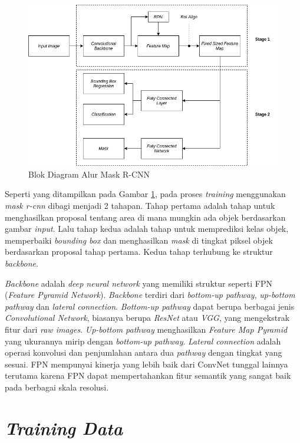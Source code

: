 \begin{figure}[ht]
	\centering
	\includegraphics[scale=0.4]{gambar/mask-rcnn-arch.png}
	\caption{Blok Diagram Alur Mask R-CNN}
	\label{fig:mask-rcnn-arch}
\end{figure} 

Seperti yang ditampilkan pada Gambar \ref{fig:mask-rcnn-arch}, pada proses \textit{training} menggunakan \textit{mask r-cnn} dibagi menjadi 2 tahapan. Tahap pertama adalah tahap untuk menghasilkan proposal tentang area di mana mungkin ada objek berdasarkan gambar \textit{input}. Lalu tahap kedua adalah tahap untuk memprediksi kelas objek, memperbaiki \textit{bounding box} dan menghasilkan \textit{mask} di tingkat piksel objek berdasarkan proposal tahap pertama. Kedua tahap terhubung ke struktur \textit{backbone}.

\textit{Backbone} adalah \textit{deep neural network} yang memiliki struktur seperti FPN (\textit{Feature Pyramid Network}). \textit{Backbone} terdiri dari \textit{bottom-up pathway}, \textit{up-bottom pathway} dan \textit{lateral connection}. \textit{Bottom-up pathway} dapat berupa berbagai jenis \textit{Convolutional Network}, biasanya berupa \textit{ResNet} atau \textit{VGG}, yang mengekstrak fitur dari \textit{raw images}. \textit{Up-bottom pathway} menghasilkan \textit{Feature Map Pyramid} yang ukurannya mirip dengan \textit{bottom-up pathway}. \textit{Lateral connection} adalah operasi konvolusi dan penjumlahan antara dua \textit{pathway} dengan tingkat yang sesuai. FPN mempunyai kinerja yang lebih baik dari ConvNet tunggal lainnya terutama karena FPN dapat mempertahankan fitur semantik yang sangat baik pada berbagai skala resolusi.



\section{\textit{Training Data}
	\label{sec:trainingdata}}


